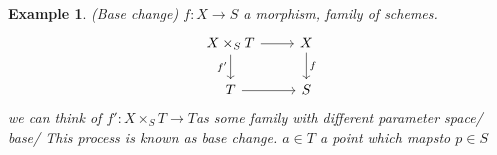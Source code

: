 \documentclass[11pt]{article}
\newtheorem{ex}[thm]{Example}
\newcommand{\lrta}{\longrightarrow}
\begin{document}
\begin{ex}
(Base change)
$f:X\lrta S$ a morphism, family of schemes.
$$
\begin{tikzcd}
X\times_S T \arrow[d, "f'"'] \arrow[r] & X \arrow[d, "f"] \\
T \arrow[r] & S
\end{tikzcd}
$$
 we can think of $f':X\times_{S}T\lrta T$as some family with different parameter space/ base/
 This process is known as base change. $a\in T$ a point which mapsto $p\in S$
\end{ex}
\end{document}
